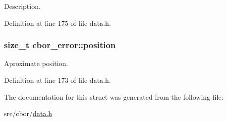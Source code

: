 Description. 



Definition at line 175 of file data.\-h.

\hypertarget{structcbor__error_a6bc04669e6fff45ad7a5e22ad5826d01}{
\subsubsection[{position}]{\setlength{\rightskip}{0pt plus 5cm}size\-\_\-t cbor\-\_\-error\-::position}}\label{structcbor__error_a6bc04669e6fff45ad7a5e22ad5826d01}


Aproximate position. 



Definition at line 173 of file data.\-h.



The documentation for this struct was generated from the following file\-:\begin{DoxyCompactItemize}
\item 
src/cbor/\hyperlink{data_8h}{data.\-h}\end{DoxyCompactItemize}

